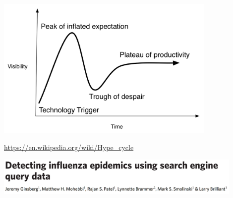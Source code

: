 \documentclass[aspectratio=169]{beamer}
\begin{document}
\begin{frame}

\begin{center}
  \includegraphics[width = 0.8\textwidth]{figures/hype_cycle}
\end{center}

\vfill
\url{https://en.wikipedia.org/wiki/Hype_cycle}

\end{frame}
\begin{frame}

\begin{center}
  \includegraphics[width = 0.9\textwidth]{figures/ginsberg_detecting_2009_title}
\end{center}

\end{frame}
\end{document}
